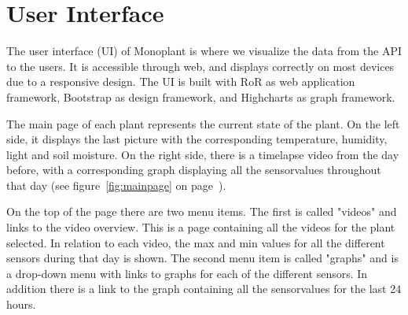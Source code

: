 








\section{User Interface}
The user interface (UI) of Monoplant is where we visualize the data from the API to the users. It is accessible through web, and displays correctly on most devices due to a responsive design. The UI is built with RoR as web application framework, Bootstrap as design framework, and Highcharts as graph framework.   

The main page of each plant represents the current state of the plant. On the left side, it displays the last picture with the corresponding temperature, humidity, light and soil moisture. On the right side, there is a timelapse video from the day before, with a corresponding graph displaying all the sensorvalues throughout that day (see figure~\ref{fig:mainpage} on page~\pageref{fig:mainpage}). 

On the top of the page there are two menu items. The first  is called "videos" and links to the video overview. This is a page containing all the videos for the plant selected. In relation to each video, the max and min values for all the different sensors during that day is shown. The second menu item is called "graphs" and is a drop-down menu with links to graphs for each of the different sensors. In addition there is a link to the graph containing all the sensorvalues for the last 24 hours. 

